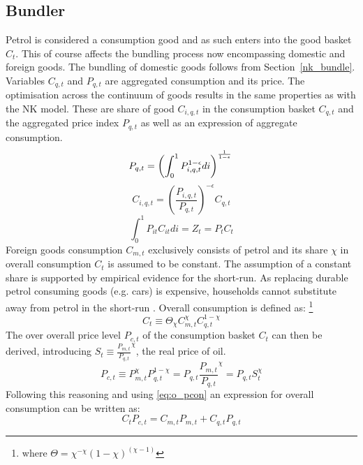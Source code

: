 \documentclass[12pt,a4paper,english]{article} %
\begin{document}
	\subsection{Bundler}
	Petrol is considered a consumption good and as such enters into the good basket $C_t$. This of course affects the bundling process now encompassing domestic and foreign goods. The bundling of domestic goods follows from Section~\ref{nk_bundle}. Variables $C_{q,t}$ and $P_{q,t}$ are aggregated consumption and its price. The optimisation across the continuum of goods results in the same properties as with the NK model. These are share of good $C_{i,q,t}$ in the consumption basket $C_{q,t}$ and the aggregated price index $P_{q,t}$ as well as an expression of aggregate consumption.
	\begin{equation} \label{eq:o_pindex}
		P_{q,t} = \left( \int_{0}^{1} P_{i,q,t}^{1 - \epsilon} di \right)^{\frac{1}{1-\epsilon}} \\
	\end{equation}
	\begin{equation} \label{eq:o_cshare}
		C_{i,q,t} = \left( \frac{P_{i,q,t}}{P_{q,t}} \right)^{-\epsilon} C_{q,t}
	\end{equation}
	\begin{equation} \label{eq:o_pcon}
		\int_{0}^{1} P_{it} C_{it} di = Z_t = P_t C_t
	\end{equation}
	Foreign goods consumption $C_{m,t}$ exclusively consists of petrol and its share $\chi$ in overall consumption $C_t$ is assumed to be constant. The assumption of a constant share is supported by empirical evidence for the short-run. As replacing durable petrol consuming goods (e.g. cars) is expensive, households cannot substitute away from petrol in the short-run \cite{blanchard_macroeconomic_2007}. Overall consumption is defined as: \footnote{where $\Theta = \chi^{-\chi}(1-\chi)^{(\chi-1)}$}
	\begin{equation}
		C_t \equiv \Theta_\chi C_{m,t}^\chi C_{q,t}^{1-\chi}
	\end{equation}
	The over overall price level $P_{c,t}$ of the consumption basket $C_t$ can then be derived, introducing $S_t \equiv \frac{P_{m,t}}{P_{q,t}}^\chi$, the real price of oil.
	\begin{equation}
		P_{c,t} \equiv P_{m,t}^\chi P_{q,t}^{1-\chi} 
			= P_{q,t} \frac{P_{m,t}}{P_{q,t}}^\chi
			= P_{q,t} S_t^\chi
	\end{equation}
	Following this reasoning and using \eqref{eq:o_pcon} an expression for overall consumption can be written as:
	\begin{equation}
		C_t P_{c,t} = C_{m,t}P_{m,t} + C_{q,t}P_{q,t}
	\end{equation}
\end{document}
